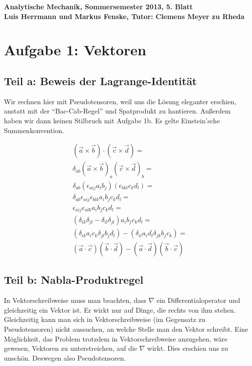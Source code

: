 \documentclass[a4paper,german,12pt,smallheadings]{scrartcl}
\begin{document}
\begin{center}
\bfseries %
\sffamily %
\vspace{-40pt}
Analytische Mechanik, Sommersemester 2013, 5. Blatt \\
Luis Herrmann und Markus Fenske, Tutor: Clemens Meyer zu Rheda
\vspace{-10pt}
\end{center}
\section*{Aufgabe 1: Vektoren}
\subsection*{Teil a: Beweis der Lagrange-Identität}

Wir rechnen hier mit Pseudotensoren, weil uns die Lösung eleganter
erschien, anstatt mit der ``Bac-Cab-Regel'' und Spatprodukt zu hantieren.
Außerdem haben wir dann keinen Stilbruch mit Aufgabe 1b. Es gelte Einstein'sche
Summenkonvention.

\begin{align*}
  &(\vec{a} \times \vec{b}) \cdot (\vec{c} \times \vec{d}) =\\
  &\delta_{ab}(\vec{a} \times \vec{b})_a (\vec{c} \times \vec{d})_b =\\
  &\delta_{ab}(\epsilon_{aij} a_i b_j) (\epsilon_{bkl}c_k d_l) =\\
  &\delta_{ab}\epsilon_{aij}\epsilon_{blk} a_i b_jc_kd_l =\\
  &\epsilon_{aij}\epsilon_{alk} a_i b_jc_kd_l =\\
  &(\delta_{ik}\delta_{jl}-\delta_{il}\delta_{jl}) a_i b_j c_k d_l =\\
  &(\delta_{ik}a_ic_k \delta_{jl}b_jd_l)-(\delta_{il}a_id_l\delta_{jk}b_jc_k) =\\
  &(\vec{a} \cdot \vec{c})(\vec{b} \cdot \vec{d})-(\vec{a}\cdot\vec{d})(\vec{b} \cdot \vec{c})
\end{align*}

\subsection*{Teil b: Nabla-Produktregel}

In Vektorschreibweise muss man beachten, dass $\nabla$ ein Differentialoperator
und gleichzeitig ein Vektor ist. Er wirkt nur auf Dinge, die rechts von ihm
stehen. Gleichzeitig kann man sich in Vektorschreibweise (im Gegensatz zu
Pseudotensoren) nicht aussuchen, an welche Stelle man den Vektor schreibt. Eine
Möglichkeit, das Problem trotzdem in Vektorschreibweise anzugehen, wäre
gewesen, Vektoren zu unterstreichen, auf die $\nabla$ wirkt. Dies erschien uns
zu unschön. Deswegen also Pseudotensoren.
\end{document}
